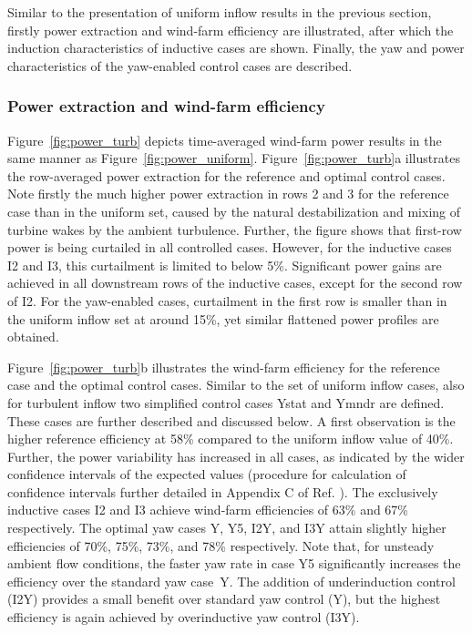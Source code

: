 \documentclass[energies,article,submit,moreauthors,latex,10pt,a4paper]{mdpi}
\begin{document}
Similar to the presentation of uniform inflow results in the previous section, firstly power extraction and wind-farm efficiency are illustrated, after which the induction characteristics of inductive cases are shown. Finally, the yaw and power characteristics of the yaw-enabled control cases are described.

\subsubsection{Power extraction and wind-farm efficiency}\label{subsec:turb_powerextr}
\noindent Figure~\ref{fig:power_turb} depicts time-averaged wind-farm power results in the same manner as Figure~\ref{fig:power_uniform}. Figure~\ref{fig:power_turb}a illustrates the row-averaged power extraction for the reference and optimal control cases. Note firstly the much higher power extraction in rows 2 and 3 for the reference case than in the uniform set, caused by the natural destabilization and mixing of turbine wakes by the ambient turbulence. Further, the figure shows that first-row power is being curtailed in all controlled cases. However, for the inductive cases I2 and I3, this curtailment is limited to below 5\%. Significant power gains are achieved in all downstream rows of the inductive cases, except for the second row of I2. For the yaw-enabled cases, curtailment in the first row is smaller than in the uniform inflow set at around 15\%, yet similar flattened power profiles are obtained. 

Figure~\ref{fig:power_turb}b illustrates the wind-farm efficiency for the reference case and the optimal control cases. Similar to the set of uniform inflow cases, also for turbulent inflow two simplified control cases Ystat and Ymndr are defined. These cases are further described and discussed below. A first observation is the higher reference efficiency at 58\% compared to the uniform inflow value of 40\%. Further, the power variability has increased in all cases, as indicated by the wider confidence intervals of the expected values (procedure for calculation of confidence intervals further detailed in Appendix C of Ref. \cite{munters2017optimal}). The exclusively inductive cases I2 and I3 achieve wind-farm efficiencies of 63\% and 67\% respectively. The optimal yaw cases Y, Y5, I2Y, and I3Y attain slightly higher efficiencies of 70\%, 75\%, 73\%, and 78\% respectively. Note that, for unsteady ambient flow conditions, the faster yaw rate in case Y5 significantly increases the efficiency over the standard yaw case~Y. The addition of underinduction control (I2Y) provides a small benefit over standard yaw control (Y), but the highest efficiency is again achieved by overinductive yaw control (I3Y). 
\end{document}

